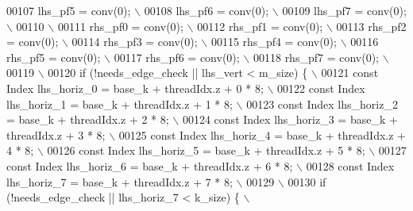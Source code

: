 \begin{DoxyCode}
00107 \textcolor{preprocessor}{    lhs\_pf5 = conv(0);                                          \(\backslash\)}
00108 \textcolor{preprocessor}{    lhs\_pf6 = conv(0);                                          \(\backslash\)}
00109 \textcolor{preprocessor}{    lhs\_pf7 = conv(0);                                          \(\backslash\)}
00110 \textcolor{preprocessor}{                                                                \(\backslash\)}
00111 \textcolor{preprocessor}{    rhs\_pf0 = conv(0);                                          \(\backslash\)}
00112 \textcolor{preprocessor}{    rhs\_pf1 = conv(0);                                          \(\backslash\)}
00113 \textcolor{preprocessor}{    rhs\_pf2 = conv(0);                                          \(\backslash\)}
00114 \textcolor{preprocessor}{    rhs\_pf3 = conv(0);                                          \(\backslash\)}
00115 \textcolor{preprocessor}{    rhs\_pf4 = conv(0);                                          \(\backslash\)}
00116 \textcolor{preprocessor}{    rhs\_pf5 = conv(0);                                          \(\backslash\)}
00117 \textcolor{preprocessor}{    rhs\_pf6 = conv(0);                                          \(\backslash\)}
00118 \textcolor{preprocessor}{    rhs\_pf7 = conv(0);                                          \(\backslash\)}
00119 \textcolor{preprocessor}{                                                                \(\backslash\)}
00120 \textcolor{preprocessor}{    if (!needs\_edge\_check || lhs\_vert < m\_size) \{               \(\backslash\)}
00121 \textcolor{preprocessor}{      const Index lhs\_horiz\_0 = base\_k + threadIdx.z + 0 * 8;   \(\backslash\)}
00122 \textcolor{preprocessor}{      const Index lhs\_horiz\_1 = base\_k + threadIdx.z + 1 * 8;   \(\backslash\)}
00123 \textcolor{preprocessor}{      const Index lhs\_horiz\_2 = base\_k + threadIdx.z + 2 * 8;   \(\backslash\)}
00124 \textcolor{preprocessor}{      const Index lhs\_horiz\_3 = base\_k + threadIdx.z + 3 * 8;   \(\backslash\)}
00125 \textcolor{preprocessor}{      const Index lhs\_horiz\_4 = base\_k + threadIdx.z + 4 * 8;   \(\backslash\)}
00126 \textcolor{preprocessor}{      const Index lhs\_horiz\_5 = base\_k + threadIdx.z + 5 * 8;   \(\backslash\)}
00127 \textcolor{preprocessor}{      const Index lhs\_horiz\_6 = base\_k + threadIdx.z + 6 * 8;   \(\backslash\)}
00128 \textcolor{preprocessor}{      const Index lhs\_horiz\_7 = base\_k + threadIdx.z + 7 * 8;   \(\backslash\)}
00129 \textcolor{preprocessor}{                                                                \(\backslash\)}
00130 \textcolor{preprocessor}{      if (!needs\_edge\_check || lhs\_horiz\_7 < k\_size) \{          \(\backslash\)}

\end{DoxyCode}
